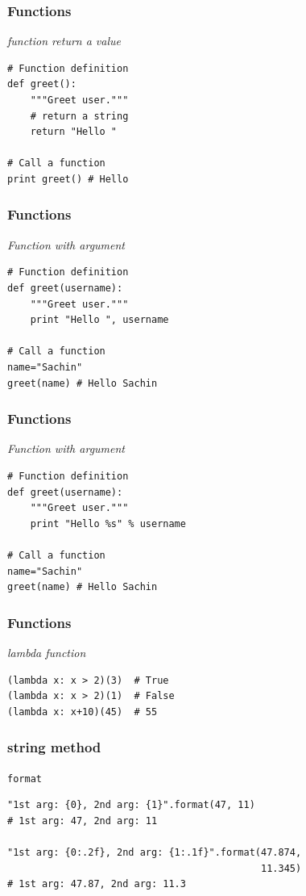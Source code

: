 \documentclass[bigger, presentation]{beamer}
\begin{document}
\begin{frame}[fragile]
\frametitle{Functions}
\label{sec-2-11}

   \emph{function return a value}


\begin{verbatim}
# Function definition
def greet():
    """Greet user."""
    # return a string
    return "Hello "

# Call a function
print greet() # Hello
\end{verbatim}
\end{frame}
\begin{frame}[fragile]
\frametitle{Functions}
\label{sec-2-12}

   \emph{Function with argument}


\begin{verbatim}
# Function definition
def greet(username):
    """Greet user."""
    print "Hello ", username

# Call a function
name="Sachin"
greet(name) # Hello Sachin
\end{verbatim}
\end{frame}
\begin{frame}[fragile]
\frametitle{Functions}
\label{sec-2-13}

   \emph{Function with argument}


\begin{verbatim}
# Function definition
def greet(username):
    """Greet user."""
    print "Hello %s" % username

# Call a function
name="Sachin"
greet(name) # Hello Sachin
\end{verbatim}
\end{frame}
\begin{frame}[fragile]
\frametitle{Functions}
\label{sec-2-14}

   \emph{lambda function}


\begin{verbatim}
(lambda x: x > 2)(3)  # True
(lambda x: x > 2)(1)  # False
(lambda x: x+10)(45)  # 55
\end{verbatim}
\end{frame}
\begin{frame}[fragile]
\frametitle{string method}
\label{sec-2-15}

   \texttt{format}

\begin{verbatim}
"1st arg: {0}, 2nd arg: {1}".format(47, 11)
# 1st arg: 47, 2nd arg: 11

"1st arg: {0:.2f}, 2nd arg: {1:.1f}".format(47.874,
                                            11.345)
# 1st arg: 47.87, 2nd arg: 11.3
\end{verbatim}
\end{frame}
\end{document}
